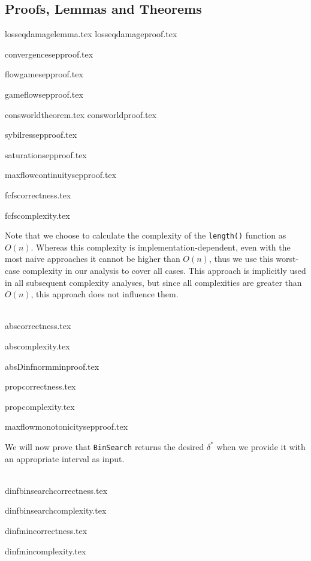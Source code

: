 \subsection{Proofs, Lemmas and Theorems}
  {losseqdamagelemma.tex}
  {losseqdamageproof.tex}

  {convergencesepproof.tex}

  {flowgamesepproof.tex}

  {gameflowsepproof.tex}

  {consworldtheorem.tex}
  {consworldproof.tex}

  {sybilressepproof.tex}

  {saturationsepproof.tex}

  {maxflowcontinuitysepproof.tex}

  {fcfscorrectness.tex}

  {fcfscomplexity.tex}

  Note that we choose to calculate the complexity of the \texttt{length()} function as $O\left(n\right)$. Whereas this
  complexity is implementation-dependent, even with the most naive approaches it cannot be higher than $O\left(n\right)$,
  thus we use this worst-case complexity in our analysis to cover all cases. This approach is implicitly used in all
  subsequent complexity analyses, but since all complexities are greater than $O\left(n\right)$, this approach does not
  influence them.

  \ \\

  {abscorrectness.tex}

  {abscomplexity.tex}

  {absDinfnormminproof.tex}

  {propcorrectness.tex}

  {propcomplexity.tex}

  {maxflowmonotonicitysepproof.tex}

  We will now prove that \texttt{BinSearch} returns the desired $\delta^*$ when we provide it with an appropriate interval as
  input.

  \ \\

  {dinfbinsearchcorrectness.tex}

  {dinfbinsearchcomplexity.tex}

  {dinfmincorrectness.tex}

  {dinfmincomplexity.tex}
